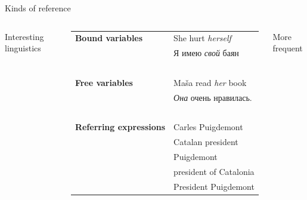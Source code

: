 \documentclass[dvipsnames, 10pt, compress]{beamer}
\begin{document}
\begin{frame}{Kinds of reference}

\begin{columns}





Interesting linguistics 
~\\

\begin{tabular}{ll}

\textbf{Bound variables} & She hurt \emph{herself} \\
                         & Я имею \emph{свой} баян \\


~ & ~ \\
\textbf{Free variables} & Maša read \emph{her} book \\
                        & \emph{Она} очень нравилась. \\


~ & ~ \\

\textbf{Referring expressions} & Carles Puigdemont \\
                               & Catalan president \\
                               & Puigdemont \\ 
                               & president of Catalonia \\
                               & President Puigdemont \\
\end{tabular}

More frequent

\end{columns}

\end{frame}
\end{document}
